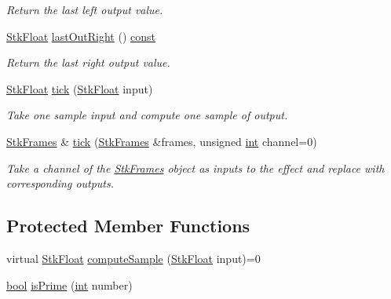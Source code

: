 \begin{DoxyCompactItemize}
\begin{DoxyCompactList}\small\item\em Return the last left output value. \end{DoxyCompactList}\item 
\hyperlink{namespace_nyq_a044fa20a706520a617bbbf458a7db7e4}{Stk\+Float} \hyperlink{class_nyq_1_1_effect_a54e9882580122738933b73da63c4909a}{last\+Out\+Right} () \hyperlink{getopt1_8c_a2c212835823e3c54a8ab6d95c652660e}{const} 
\begin{DoxyCompactList}\small\item\em Return the last right output value. \end{DoxyCompactList}\item 
\hyperlink{namespace_nyq_a044fa20a706520a617bbbf458a7db7e4}{Stk\+Float} \hyperlink{class_nyq_1_1_effect_a2da4c41a4d12c7d348c43909b9c8ab4a}{tick} (\hyperlink{namespace_nyq_a044fa20a706520a617bbbf458a7db7e4}{Stk\+Float} input)
\begin{DoxyCompactList}\small\item\em Take one sample input and compute one sample of output. \end{DoxyCompactList}\item 
\hyperlink{class_nyq_1_1_stk_frames}{Stk\+Frames} \& \hyperlink{class_nyq_1_1_effect_ad23074c5719f9fabbbf42985dcc4b110}{tick} (\hyperlink{class_nyq_1_1_stk_frames}{Stk\+Frames} \&frames, unsigned \hyperlink{xmltok_8h_a5a0d4a5641ce434f1d23533f2b2e6653}{int} channel=0)
\begin{DoxyCompactList}\small\item\em Take a channel of the \hyperlink{class_nyq_1_1_stk_frames}{Stk\+Frames} object as inputs to the effect and replace with corresponding outputs. \end{DoxyCompactList}\end{DoxyCompactItemize}
\subsection*{Protected Member Functions}
\begin{DoxyCompactItemize}
\item 
virtual \hyperlink{namespace_nyq_a044fa20a706520a617bbbf458a7db7e4}{Stk\+Float} \hyperlink{class_nyq_1_1_effect_a40617970361f1e7b6a55ce1e588e3b61}{compute\+Sample} (\hyperlink{namespace_nyq_a044fa20a706520a617bbbf458a7db7e4}{Stk\+Float} input)=0
\item 
\hyperlink{mac_2config_2i386_2lib-src_2libsoxr_2soxr-config_8h_abb452686968e48b67397da5f97445f5b}{bool} \hyperlink{class_nyq_1_1_effect_a9ca1e83adef4574fbb38380297118dd3}{is\+Prime} (\hyperlink{xmltok_8h_a5a0d4a5641ce434f1d23533f2b2e6653}{int} number)
\end{DoxyCompactItemize}
